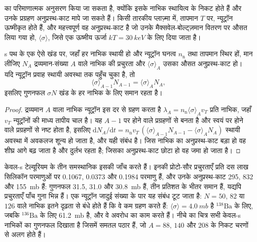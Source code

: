  का परिमाणात्मक अनुसरण किया जा सकता है, क्योंकि इसके नाभिक
स्थायित्व के निकट होते हैं और उनके प्रग्रहण अनुप्रस्थ-काट मापे जा सकते हैं।
किसी तारकीय प्लाज़्मा में, तापमान $T$ पर, न्यूट्रॉन ऊष्मीकृत होते हैं, और
महत्त्वपूर्ण वह अनुप्रस्थ-काट है जो उनके मैक्सवेल-बोल्ट्ज़मान
वितरण पर औसत लिया गया हो, $\langle\sigma\rangle$, जिसे एक ऊष्मीय ऊर्जा
$kT = \qty{30}{keV}$ के लिए दिया जाता है।

\begin{proposition}[$\sigma N$ संबंध]\label{prop:b3:origin-of-elements:sigma-n}
s पथ के एक ऐसे खंड पर, जहाँ हर नाभिक स्थायी हो और
न्यूट्रॉन घनत्व $n_\mathrm{n}$ तथा तापमान स्थिर हों, मान लीजिए $N_A$ द्रव्यमान-संख्या $A$ वाले नाभिक की प्रचुरता
और $\langle\sigma\rangle_A$ उसका औसत अनुप्रस्थ-काट हो।
यदि न्यूट्रॉन प्रवाह स्थायी अवस्था तक पहुँच चुका है,
तो
\[
\langle\sigma\rangle_{A-1} N_{A-1} = \langle\sigma\rangle_A N_A ,
\]
इसलिए गुणनफल $\sigma N$ खंड के
हर नाभिक के लिए समान रहता है।
\end{proposition}

\begin{proof}
द्रव्यमान $A$ वाला नाभिक न्यूट्रॉन इस दर से ग्रहण करता है
$\lambda_A = n_\mathrm{n}\langle\sigma\rangle_A v_T$ प्रति नाभिक, जहाँ
$v_T$ न्यूट्रॉनों की माध्य तापीय चाल है। यह $A - 1$ पर होने वाले प्रग्रहणों से बनता है
और स्वयं पर होने वाले प्रग्रहणों से नष्ट होता है, इसलिए
$\mathrm{d}N_A/\mathrm{d}t = n_\mathrm{n} v_T\,(\langle\sigma\rangle_{A-1}
N_{A-1} - \langle\sigma\rangle_A N_A)$ स्थायी अवस्था में अवकलज
शून्य हो जाता है, और यही संबंध है। जिस नाभिक का अनुप्रस्थ-काट बड़ा हो
वह शीघ्र आगे बढ़ जाता है और दुर्लभ रहता है; जिसका अनुप्रस्थ-काट छोटा हो
वह जमा हो जाता है।
\end{proof}

केवल-s टेल्यूरियम के तीन समस्थानिक इसकी जाँच करते हैं। इनकी प्रोटो-सौर
प्रचुरताएँ प्रति दस लाख सिलिकॉन परमाणुओं पर \num{0.1067}, \num{0.0373} और \num{0.1984} परमाणु हैं, और
उनके अनुप्रस्थ-काट \num{295}, \num{832} और \qty{155}{mb} हैं:
गुणनफल \num{31.5}, \num{31.0} और
\qty{30.8}{mb} हैं, तीन प्रतिशत के भीतर समान हैं,
यद्यपि प्रचुरताएँ पाँच गुना भिन्न हैं। एक न्यूट्रॉन जादुई संख्या के पार यह संबंध
टूट जाता है: $N = 50$, $82$ या $126$ वाले नाभिक इतने दृढ़ता से बंधे होते हैं कि
वे कम ग्रहण करते हैं: $\langle\sigma\rangle = \qty{4.0}{mb}$ है $^{138}\mathrm{Ba}$ के लिए,
जबकि $^{136}\mathrm{Ba}$ के लिए \qty{61.2}{mb} है, और
वे अवरोध का काम करते हैं। नीचे का चित्र सभी केवल-s नाभिकों का गुणनफल दिखाता है
जिसमें समतल पठार हैं, जो $A = 88$, $140$
और $208$ के निकट चरणों से अलग होते हैं।

